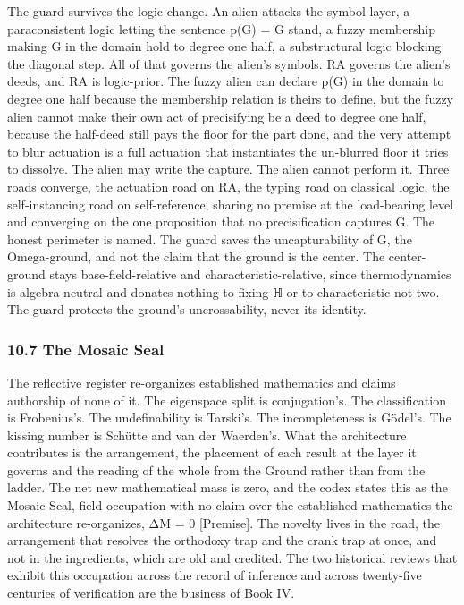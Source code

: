\documentclass[10pt,twocolumn]{article}
\begin{document}
The guard survives the logic-change. An alien attacks the symbol layer,
a paraconsistent logic letting the sentence p(G) = G stand, a fuzzy
membership making G in the domain hold to degree one half, a
substructural logic blocking the diagonal step. All of that governs the
alien's symbols. RA governs the alien's deeds, and RA is logic-prior.
The fuzzy alien can declare p(G) in the domain to degree one half
because the membership relation is theirs to define, but the fuzzy alien
cannot make their own act of precisifying be a deed to degree one half,
because the half-deed still pays the floor for the part done, and the
very attempt to blur actuation is a full actuation that instantiates the
un-blurred floor it tries to dissolve. The alien may write the capture.
The alien cannot perform it. Three roads converge, the actuation road on
RA, the typing road on classical logic, the self-instancing road on
self-reference, sharing no premise at the load-bearing level and
converging on the one proposition that no precisification captures G.
The honest perimeter is named. The guard saves the uncapturability of G,
the Omega-ground, and not the claim that the ground is the center. The
center-ground stays base-field-relative and characteristic-relative,
since thermodynamics is algebra-neutral and donates nothing to fixing ℍ
or to characteristic not two. The guard protects the ground's
uncrossability, never its identity.

\hypertarget{the-mosaic-seal}{%
\subsubsection{10.7 The Mosaic Seal}\label{the-mosaic-seal}}

The reflective register re-organizes established mathematics and claims
authorship of none of it. The eigenspace split is conjugation's. The
classification is Frobenius's. The undefinability is Tarski's. The
incompleteness is Gödel's. The kissing number is Schütte and van der
Waerden's. What the architecture contributes is the arrangement, the
placement of each result at the layer it governs and the reading of the
whole from the Ground rather than from the ladder. The net new
mathematical mass is zero, and the codex states this as the Mosaic Seal,
field occupation with no claim over the established mathematics the
architecture re-organizes, ΔM = 0 {[}Premise{]}. The novelty lives in
the road, the arrangement that resolves the orthodoxy trap and the crank
trap at once, and not in the ingredients, which are old and credited.
The two historical reviews that exhibit this occupation across the
record of inference and across twenty-five centuries of verification are
the business of Book IV.
\end{document}
